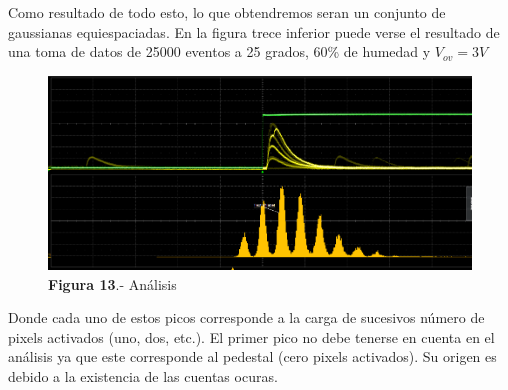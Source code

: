 Como resultado de todo esto, lo que obtendremos seran un conjunto de gaussianas equiespaciadas. En la figura trece inferior puede verse el resultado de una toma de datos de 25000 eventos a 25 grados, 60\% de humedad y $V_{ov}=3V$

\begin{figure}[hbtp]
 \centering
 \includegraphics[scale=0.4]{Analisis.png}
 \caption{\textbf{Figura 13}.- Análisis}
 \end{figure}

Donde cada uno de estos picos corresponde a la carga de sucesivos número de pixels activados (uno, dos, etc.). El primer pico no debe tenerse en cuenta en el análisis ya que este corresponde al pedestal (cero pixels activados). Su origen es debido a la existencia de las cuentas ocuras.
 
